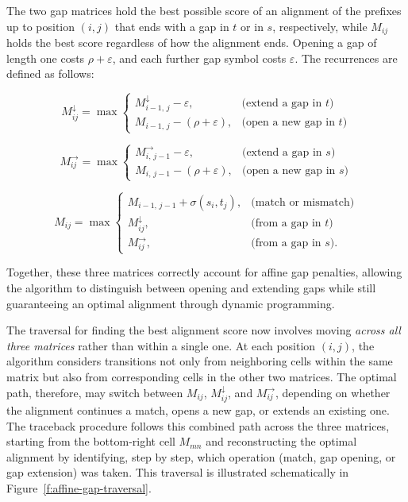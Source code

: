The two gap matrices hold the best possible score of an alignment of the prefixes up to position $(i,j)$
that ends with a gap in $t$ or in $s$, respectively, while $M_{ij}$ holds the best score regardless of how the alignment ends. Opening a gap of length one costs $\rho + \varepsilon$, and each further gap symbol costs $\varepsilon$. The recurrences are defined as follows:

\[
M_{ij}^\downarrow = \max
\begin{cases}
M_{i-1,\,j}^\downarrow - \varepsilon, & \text{(extend a gap in $t$)}\\[4pt]
M_{i-1,\,j} - (\rho + \varepsilon), & \text{(open a new gap in $t$)}
\end{cases}
\]

\[
M_{ij}^\rightarrow = \max
\begin{cases}
M_{i,\,j-1}^\rightarrow - \varepsilon, & \text{(extend a gap in $s$)}\\[4pt]
M_{i,\,j-1} - (\rho + \varepsilon), & \text{(open a new gap in $s$)}
\end{cases}
\]

\[
M_{ij} = \max
\begin{cases}
M_{i-1,\,j-1} + \sigma(s_i, t_j), & \text{(match or mismatch)}\\[4pt]
M_{ij}^\downarrow, & \text{(from a gap in $t$)}\\[4pt]
M_{ij}^\rightarrow, & \text{(from a gap in $s$)}.
\end{cases}
\]

Together, these three matrices correctly account for affine gap penalties, 
allowing the algorithm to distinguish between opening and extending gaps 
while still guaranteeing an optimal alignment through dynamic programming.

The traversal for finding the best alignment score now involves moving \emph{across all three matrices} rather than within a single one. At each position $(i,j)$, the algorithm considers transitions not only from neighboring cells within the same matrix but also from corresponding cells in the other two matrices. The optimal path, therefore, may switch between $M_{ij}$, $M_{ij}^\downarrow$, and $M_{ij}^\rightarrow$, depending on whether the alignment continues a match, opens a new gap, or extends an existing one.  The traceback procedure follows this combined path across the three matrices, starting from the bottom-right cell $M_{mn}$ and reconstructing the optimal alignment by identifying, step by step, which operation (match, gap opening, or gap extension) was taken. This traversal is illustrated schematically in Figure~\ref{f:affine-gap-traversal}.

